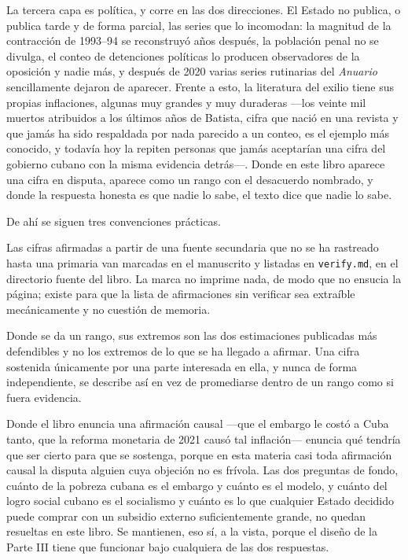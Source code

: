 La tercera capa es política, y corre en las dos direcciones. El Estado no
publica, o publica tarde y de forma parcial, las series que lo incomodan: la
magnitud de la contracción de 1993--94 se reconstruyó años después, la población
penal no se divulga, el conteo de detenciones políticas lo producen observadores
de la oposición y nadie más, y después de 2020 varias series rutinarias del
\emph{Anuario} sencillamente dejaron de aparecer. Frente a esto, la literatura
del exilio tiene sus propias inflaciones, algunas muy grandes y muy duraderas
---los veinte mil muertos atribuidos a los últimos años de Batista, cifra que
nació en una revista y que jamás ha sido respaldada por nada parecido a un
conteo, es el ejemplo más conocido, y todavía hoy la repiten personas que jamás
aceptarían una cifra del gobierno cubano con la misma evidencia detrás---. Donde
en este libro aparece una cifra en disputa, aparece como un rango con el
desacuerdo nombrado, y donde la respuesta honesta es que nadie lo sabe, el texto
dice que nadie lo sabe.

De ahí se siguen tres convenciones prácticas.

Las cifras afirmadas a partir de una fuente secundaria que no se ha rastreado
hasta una primaria van marcadas en el manuscrito y listadas en
\texttt{verify.md}, en el directorio fuente del libro. La marca no imprime nada,
de modo que no ensucia la página; existe para que la lista de afirmaciones sin
verificar sea extraíble mecánicamente y no cuestión de memoria.

Donde se da un rango, sus extremos son las dos estimaciones publicadas más
defendibles y no los extremos de lo que se ha llegado a afirmar. Una cifra
sostenida únicamente por una parte interesada en ella, y nunca de forma
independiente, se describe así en vez de promediarse dentro de un rango como si
fuera evidencia.

Donde el libro enuncia una afirmación causal ---que el embargo le costó a Cuba
tanto, que la reforma monetaria de 2021 causó tal inflación--- enuncia qué
tendría que ser cierto para que se sostenga, porque en esta materia casi toda
afirmación causal la disputa alguien cuya objeción no es frívola. Las dos
preguntas de fondo, cuánto de la pobreza cubana es el embargo y cuánto es el
modelo, y cuánto del logro social cubano es el socialismo y cuánto es lo que
cualquier Estado decidido puede comprar con un subsidio externo suficientemente
grande, no quedan resueltas en este libro. Se mantienen, eso sí, a la vista,
porque el diseño de la Parte III tiene que funcionar bajo cualquiera de las dos
respuestas.
